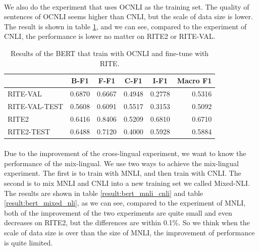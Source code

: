 \documentclass{article}
\begin{document}
\begin{CJK*}{UTF8}{bkai}
\paragraph{}
We also do the experiment that uses OCNLI as the training set. The quality of sentences of OCNLI seems higher than CNLI, but the scale of data size is lower. The result is shown in table \ref{result:bert_ocnli_transfer}, and we can see, compared to the experiment of CNLI, the performance is lower no matter on RITE2 or RITE-VAL.

\begin{table}[ht!]
  \centering
  \begin{tabular}{|l|r|r|r|r|r|}
  \hline
   & \multicolumn{1}{c|}{B-F1} & \multicolumn{1}{c|}{F-F1} & \multicolumn{1}{c|}{C-F1} & \multicolumn{1}{c|}{I-F1} & \multicolumn{1}{c|}{Macro F1} \\ \hline
  RITE-VAL & 0.6870 & 0.6667 & 0.4948 & 0.2778 & 0.5316 \\ \hline
  RITE-VAL-TEST & 0.5608 & 0.6091 & 0.5517 & 0.3153 & 0.5092 \\ \hline
  RITE2 & 0.6416 & 0.8406 & 0.5209 & 0.6810 & 0.6710 \\ \hline
  RITE2-TEST & 0.6488 & 0.7120 & 0.4000 & 0.5928 & 0.5884 \\ \hline
  \end{tabular}
  \caption{Results of the BERT that train with OCNLI and fine-tune with RITE.}
  \label{result:bert_ocnli_transfer}
\end{table}

\paragraph{}
Due to the improvement of the cross-lingual experiment, we want to know the performance of the mix-lingual. We use two ways to achieve the mix-lingual experiment. The first is to train with MNLI, and then train with CNLI. The second is to mix MNLI and CNLI into a new training set we called Mixed-NLI. The results are shown in table \ref{result:bert_mnli_cnli} and table \ref{result:bert_mixed_nli}, as we can see, compared to the experiment of MNLI, both of the improvement of the two experiments are quite small and even decreases on RITE2, but the differences are within 0.1\%. So we think when the scale of data size is over than the size of MNLI, the improvement of performance is quite limited.


\end{CJK*}
\end{document}
